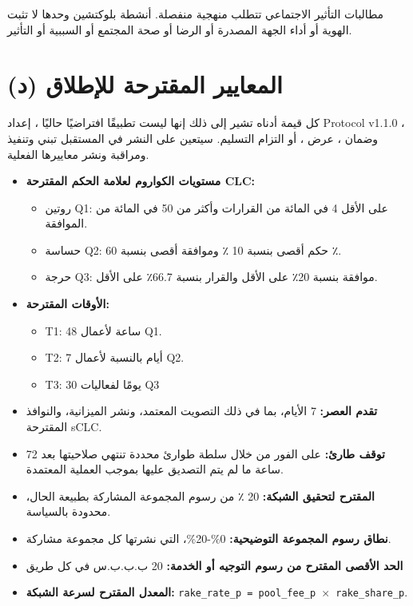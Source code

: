 \documentclass[11pt]{article}
\begin{document}
مطالبات التأثير الاجتماعي تتطلب منهجية منفصلة. أنشطة بلوكتشين وحدها لا تثبت الهوية أو أداء الجهة المصدرة أو الرضا أو صحة المجتمع أو السببية أو التأثير.


\section*{(د) المعايير المقترحة للإطلاق}

كل قيمة أدناه تشير إلى ذلك إنها ليست تطبيقًا افتراضيًا حاليًا ، إعداد Protocol v1.1.0 ، وضمان ، عرض ، أو التزام التسليم. سيتعين على النشر في المستقبل تبني وتنفيذ ومراقبة ونشر معاييرها الفعلية.

\begin{itemize}[leftmargin=*]
\item \textbf{مستويات الكواروم لعلامة الحكم المقترحة CLC:}
\begin{itemize}[leftmargin=*]
\item روتين Q1: على الأقل 4 في المائة من القرارات وأكثر من 50 في المائة من الموافقة.
\item حساسة Q2: حكم أقصى بنسبة 10 ٪ وموافقة أقصى بنسبة 60 ٪.
\item حرجة Q3: موافقة بنسبة 20٪ على الأقل والقرار بنسبة 66.7٪ على الأقل.
\end{itemize}
\item \textbf{الأوقات المقترحة:}
\begin{itemize}[leftmargin=*]
\item T1: 48 ساعة لأعمال Q1.
\item T2: 7 أيام بالنسبة لأعمال Q2.
\item T3: 30 يومًا لفعاليات Q3
\end{itemize}
\item \textbf{تقدم العصر:} 7 الأيام، بما في ذلك التصويت المعتمد، ونشر الميزانية، والنوافذ المقترحة sCLC.
\item \textbf{توقف طارئ:} على الفور من خلال سلطة طوارئ محددة تنتهي صلاحيتها بعد 72 ساعة ما لم يتم التصديق عليها بموجب العملية المعتمدة.
\item \textbf{المقترح لتحقيق الشبكة:} 20 ٪ من رسوم المجموعة المشاركة بطبيعة الحال، محدودة بالسياسة.
\item \textbf{نطاق رسوم المجموعة التوضيحية:} 0\%-20\%، التي نشرتها كل مجموعة مشاركة.
\item \textbf{الحد الأقصى المقترح من رسوم التوجيه أو الخدمة:} 20 ب.ب.ب.س في كل طريق
\item \textbf{المعدل المقترح لسرعة الشبكة:} \texttt{rake\_rate\_p = pool\_fee\_p $\times$ rake\_share\_p}.

\end{itemize}
\end{document}
